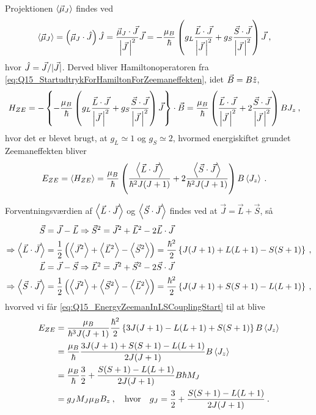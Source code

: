 Projektionen $\Braket{\Vec{\mu}_J}$ findes ved
\begin{align}
    \Braket{\Vec{\mu}_J} &= \left(\Vec{\mu}_J \cdot \Hat{J}\right) \Hat{J} = \frac{\Vec{\mu}_J \cdot \Vec{J}}{\abs{\Vec{J} \,}^2} \Vec{J} = - \frac{\mu_B}{\hbar} \left( g_L \frac{\Vec{L} \cdot \Vec{J}}{\abs{\Vec{J} \,}^2} + g_S \frac{\Vec{S} \cdot \Vec{J}}{\abs{\Vec{J} \,}^2} \right) \Vec{J} \: ,
\end{align}
hvor $\Hat{J} = \Vec{J}/|\Vec{J}|$. Derved bliver Hamiltonoperatoren fra \cref{eq:Q15_StartudtrykForHamiltonForZeemaneffekten}, idet $\Vec{B} = B\Hat{z}$,
\begin{align}
    H_{ZE} &= -\left\{- \frac{\mu_B}{\hbar} \left( g_L \frac{\Vec{L} \cdot \Vec{J}}{\abs{\Vec{J} \,}^2} + g_S \frac{\Vec{S} \cdot \Vec{J}}{\abs{\Vec{J} \,}^2} \right) \Vec{J} \right\} \cdot \Vec{B} = \frac{\mu_B}{\hbar} \left( \frac{\Vec{L} \cdot \Vec{J}}{\abs{\Vec{J} \,}^2} + 2\frac{\Vec{S} \cdot \Vec{J}}{\abs{\Vec{J} \,}^2} \right) B J_z \: ,
\end{align}
hvor det er blevet brugt, at $g_L \simeq 1$ og $g_S \simeq 2$, hvormed energiskiftet grundet Zeemaneffekten bliver
\begin{align} \label{eq:Q15_EnergyZeemanInLSCouplingStart}
    E_{ZE} &= \Braket{H_{ZE}} = \frac{\mu_B}{\hbar} \left( \frac{\Braket{\Vec{L} \cdot \Vec{J}}}{\hbar^2 J(J+1)} + 2 \frac{\Braket{\Vec{S} \cdot \Vec{J}}}{\hbar^2 J(J+1)} \right) B \Braket{J_z} \: .
\end{align}

Forventningsværdien af $\Braket{\Vec{L} \cdot \Vec{J}}$ og $\Braket{\Vec{S} \cdot \Vec{J}}$ findes ved at $\Vec{J} = \Vec{L} + \Vec{S}$, så
\begin{align}
    \Vec{S} &= \Vec{J} - \Vec{L} \Rightarrow \Vec{S}^2 = \Vec{J}^2 + \Vec{L}^2 - 2\Vec{L} \cdot \Vec{J} \nonumber\\
    \Rightarrow \Braket{\Vec{L} \cdot \Vec{J}} &= \frac{1}{2} \left(\Braket{\Vec{J}^2} + \Braket{\Vec{L}^2} - \Braket{\Vec{S}^2}\right) = \frac{\hbar^2}{2} \left\{J(J+1) + L(L+1) - S(S+1)\right\} \: , \\
    \Vec{L} &= \Vec{J} - \Vec{S} \Rightarrow \Vec{L}^2 = \Vec{J}^2 + \Vec{S}^2 - 2\Vec{S} \cdot \Vec{J} \nonumber\\
    \Rightarrow \Braket{\Vec{S} \cdot \Vec{J}} &= \frac{1}{2} \left(\Braket{\Vec{J}^2} + \Braket{\Vec{S}^2} - \Braket{\Vec{L}^2}\right) = \frac{\hbar^2}{2} \left\{J(J+1) + S(S+1) - L(L+1)\right\} \: ,
\end{align}
hvorved vi får \cref{eq:Q15_EnergyZeemanInLSCouplingStart} til at blive
\begin{align}
    E_{ZE} &= \frac{\mu_B}{\hbar^3 J(J+1)} \frac{\hbar^2}{2}\left\{3J(J+1) - L(L+1) + S(S+1)\right\} B \Braket{J_z} \nonumber\\
    &= \frac{\mu_B}{\hbar} \frac{3J(J+1) + S(S+1) - L(L+1)}{2J(J+1)} B \Braket{J_z} \nonumber\\
    &= \frac{\mu_B}{\hbar} \frac{3}{2} + \frac{S(S+1) - L(L+1)}{2J(J+1)} B \hbar M_J \nonumber\\
    &= g_J M_J \mu_B B_z \: , \quad \text{hvor} \quad g_J = \frac{3}{2} + \frac{S(S+1) - L(L+1)}{2J(J+1)} \: .
\end{align}



